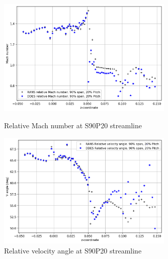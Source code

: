\begin{figure}[ht]
  \centering
  \includegraphics[width=0.75\textwidth]{Pictures/mach-rel-S90-P20.png}
  \caption{Relative Mach number at S90P20 streamline} \label{mach-rel-S90-P20}
  \vspace*{\floatsep}%
  \includegraphics[width=0.75\textwidth]{Pictures/vang-rel-S90-P20.png}
  \caption{Relative velocity angle at S90P20 streamline} \label{vang-rel-S90-P20}
\end{figure}


